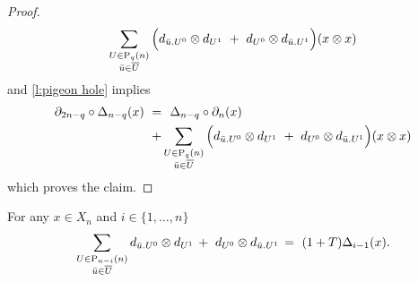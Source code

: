 \begin{proof}
\begin{align*}
	\sum_{\substack{U\in\mathrm{P}_{q}(n) \\ {\bar{u}} \in \overline{U}}} \Big( d_{{\bar{u}}.U^0} \otimes d_{U^1}\ +\ d_{U^0} \otimes d_{{\bar{u}}.U^1}\Big) (x \otimes x)
	\end{align*}
	and \cref{l:pigeon hole} implies
	\begin{align*}
	\partial_{2n-q} \circ \Delta_{n - q} (x) \ =& \ \
	\Delta_{n-q} \circ \partial_n (x) \ \  \\ +&
	\sum_{\substack{U\in\mathrm{P}_{q}(n) \\ {\bar{u}} \in \overline{U}}} \Big( d_{{\bar{u}}.U^0} \otimes d_{U^1}\ +\ d_{U^0} \otimes d_{{\bar{u}}.U^1}\Big) (x \otimes x)
	\end{align*}
	which proves the claim.
\end{proof}

\begin{lemma} \label{l:big lemma}
	For any $x \in X_n$ and $i \in \{1, \dots, n\}$
	\begin{equation}
	\sum_{\substack{U \in \mathrm{P}_{n-i}(n) \\ {\bar{u}} \in \overline{U}}} d_{{\bar{u}}.U^0} \otimes d_{U^1}\, +\ d_{U^0} \otimes d_{{\bar{u}}.U^1}\, = \
	(1+T) \Delta_{i-1}(x).
	\end{equation}
\end{lemma}

